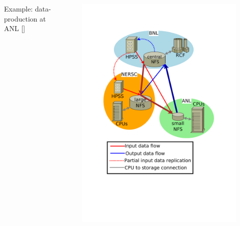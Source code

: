 \documentclass{beamer}
\begin{document}
\begin{frame}
\begin{columns}[c]
\begin{footnotesize}
\begin{block}{Example: data-production at ANL  [\cite{Balewski}]}
\begin{itemize}
		\end{itemize}
 	\end{block}
 	\end{footnotesize} 
		\begin{figure}
			\begin{center}
			    \vspace{-15mm}
				\includegraphics [width=1.2\textwidth]{pic/Data_production_schema_ANL2.pdf}
			\end{center}
			\end{figure} 	 	
 	\end{columns}
\end{frame}
\end{document}
